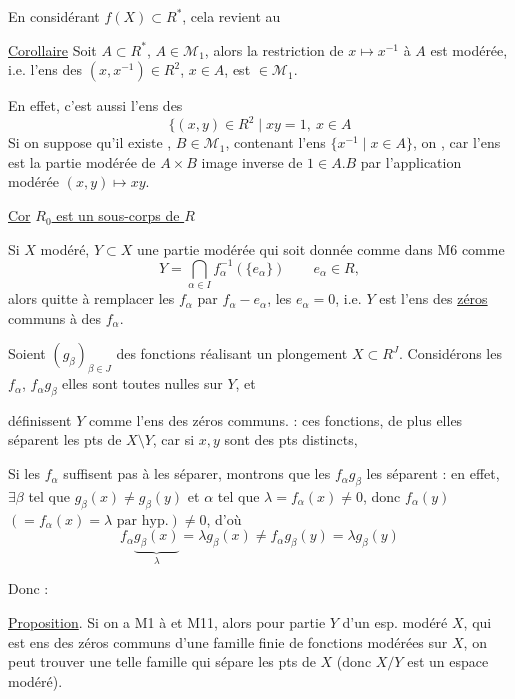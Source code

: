 En considérant $f(X)\subset R^*$, cela revient au

\uline{Corollaire} Soit $A\subset R^*$, $A\in\mathcal M_1$, alors la restriction de $x\mapsto x^{-1}$ à $A$ est modérée, i.e. l'ens des $(x,x^{-1})\in R^2$, $x\in A$, est $\in\mathcal M_1$.


En effet, c'est aussi l'ens des
\[
\{(x,y)\in R^2\mid xy=1,\ x\in A
\]
Si on suppose qu'il existe , $B\in\mathcal M_1$, contenant l'ens  $\{x^{-1}\mid x\in A\}$, on , car l'ens est la partie modérée de $A\times B$ image inverse de $1\in A.B$  par l'application modérée $(x,y)\mapsto xy$.

\uline{Cor} \uline{$R_0$ est un sous-corps de $R$}


Si $X$ modéré, $Y\subset X$ une partie modérée qui soit donnée comme dans M6 comme
\[
Y=\bigcap_{\alpha\in I} f_\alpha^{-1}(\{e_\alpha\})\qquad e_\alpha\in R,
\]
alors quitte à remplacer les $f_\alpha$ par $f_\alpha-e_\alpha$,  les $e_\alpha=0$, i.e. $Y$ est l'ens des \uline{zéros} communs à des $f_\alpha$.

Soient $(g_\beta)_{\beta\in J}$  des fonctions  réalisant un plongement $X\subset R^J$. Considérons les $f_\alpha$, $f_\alpha g_\beta$  elles sont toutes nulles sur $Y$, et



définissent $Y$ comme l'ens des zéros communs.  : ces fonctions, de plus elles séparent les pts de $X\setminus Y$, car si $x,y$ sont des pts distincts, 

Si les $f_\alpha$  suffisent pas à les séparer, montrons que les $f_\alpha g_\beta$ les séparent : en effet, $\exists\beta$ tel que $g_\beta(x)\ne g_\beta(y)$  et $\alpha$ tel que $\lambda=f_\alpha(x)\ne0$, donc $f_\alpha(y)$ $(=f_\alpha(x)=\lambda\text{ par hyp.})\ne0$, d'où
\[
f_\alpha\underbrace{g_\beta(x)}_{\lambda}=\lambda g_\beta(x)\ne f_\alpha g_\beta(y)=\lambda g_\beta(y)
\]

Donc :

\uline{Proposition}. Si on a M1 à  et M11, alors pour  partie   $Y$ d'un esp. modéré $X$, qui est ens des zéros communs d'une famille finie de fonctions modérées sur $X$, on peut trouver une telle famille qui sépare les pts de $X$ (donc $X/Y$ est un espace modéré).

